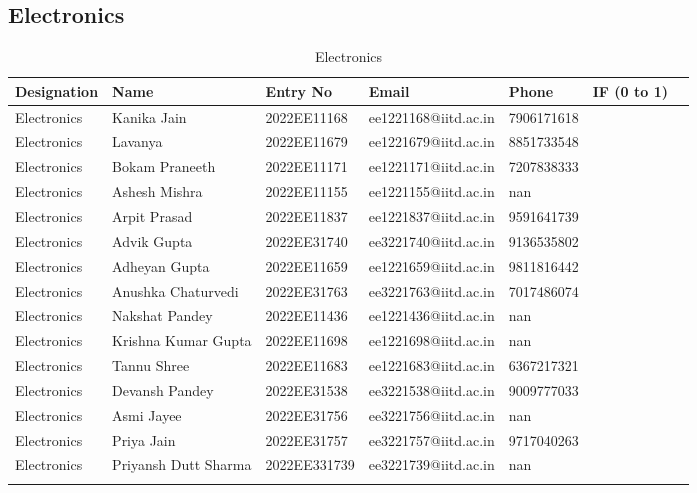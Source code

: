 \documentclass[a4paper,12pt]{article}
\begin{document}
\subsection{Electronics}
\begin{longtable}[c]{|l|l|l|l|l|l|l|}
\hline
\textbf{Designation} & \textbf{Name} & \textbf{Entry No} & \textbf{Email} & \textbf{Phone} & \textbf{IF (0 to 1)} \\
\hline
Electronics & Kanika Jain & 2022EE11168 & ee1221168@iitd.ac.in & 7906171618 &  &  \\ \hline
Electronics & Lavanya & 2022EE11679 & ee1221679@iitd.ac.in & 8851733548 &  &  \\ \hline
Electronics & Bokam Praneeth & 2022EE11171 & ee1221171@iitd.ac.in & 7207838333 &  &  \\ \hline
Electronics & Ashesh Mishra & 2022EE11155 & ee1221155@iitd.ac.in & nan &  &  \\ \hline
Electronics & Arpit Prasad & 2022EE11837 & ee1221837@iitd.ac.in & 9591641739 &  &  \\ \hline
Electronics & Advik Gupta & 2022EE31740 & ee3221740@iitd.ac.in & 9136535802 &  &  \\ \hline
Electronics & Adheyan Gupta & 2022EE11659 & ee1221659@iitd.ac.in & 9811816442 &  &  \\ \hline
Electronics & Anushka Chaturvedi & 2022EE31763 & ee3221763@iitd.ac.in & 7017486074 &  &  \\ \hline
Electronics & Nakshat Pandey & 2022EE11436 & ee1221436@iitd.ac.in & nan &  &  \\ \hline
Electronics & Krishna Kumar Gupta & 2022EE11698 & ee1221698@iitd.ac.in & nan &  &  \\ \hline
Electronics & Tannu Shree & 2022EE11683 & ee1221683@iitd.ac.in & 6367217321 &  &  \\ \hline
Electronics & Devansh Pandey & 2022EE31538 & ee3221538@iitd.ac.in & 9009777033 &  &  \\ \hline
Electronics & Asmi Jayee & 2022EE31756 & ee3221756@iitd.ac.in & nan &  &  \\ \hline
Electronics & Priya Jain & 2022EE31757 & ee3221757@iitd.ac.in & 9717040263 &  &  \\ \hline
Electronics & Priyansh Dutt Sharma & 2022EE331739 & ee3221739@iitd.ac.in & nan &  &  \\ \hline
\caption{Electronics}
\end{longtable}
\end{document}
